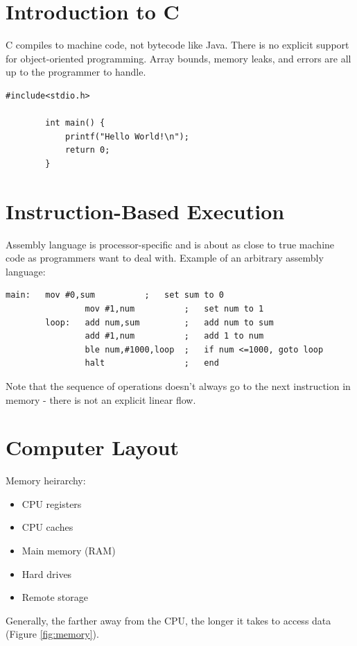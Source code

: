\documentclass[11pt]{article}
\begin{document}
\section{Introduction to C}
	C compiles to machine code, not bytecode like Java. There is no explicit support for object-oriented programming. Array bounds, memory leaks, and errors are all up to the programmer to handle.

	\begin{lstlisting}[autogobble=true]
		#include<stdio.h>
		
		int main() {
			printf("Hello World!\n");
			return 0;
		}
	\end{lstlisting}
	
\section{Instruction-Based Execution}
	Assembly language is processor-specific and is about as close to true machine code as programmers want to deal with. Example of an arbitrary assembly language:

	\begin{lstlisting}[autogobble=true]
		main:	mov	#0,sum			;	set sum to 0
				mov	#1,num			;	set num to 1
		loop:	add	num,sum			;	add num to sum
				add	#1,num			;	add 1 to num
				ble	num,#1000,loop	;	if num <=1000, goto loop
				halt				;	end	
	\end{lstlisting}
	
	Note that the sequence of operations doesn't always go to the next instruction in memory - there is not an explicit linear flow.
	
\section{Computer Layout}
	Memory heirarchy:
	\begin{itemize}
		\item CPU registers
		\item CPU caches
		\item Main memory (RAM)
		\item Hard drives
		\item Remote storage
	\end{itemize}
	
	Generally, the farther away from the CPU, the longer it takes to access data (Figure \ref{fig:memory}).
	
\end{document}
